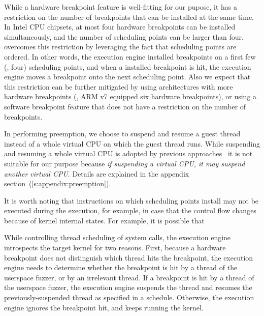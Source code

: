 %
While a hardware breakpoint feature is well-fitting for our pupose, it
has a restriction on the number of breakpoints that can be installed
at the same time.
%
In Intel CPU chipsets, at most four hardware breakpoints can be
installed simultaneously, and the number of scheduling points can be
larger than four.
%
\dr{} \sys overcomes this restriction by leveraging the fact that
scheduling points are ordered. In other words, the execution engine
installed breakpoints on a first few (\eg, four) scheduling points,
and when a installed breakpoint is hit, the execution engine moves a
breakpoint onto the next scheduling point.
%
Also we expect that this restriction can be further mitigated by using
architectures with more hardware breakpoints (\eg, ARM v7 equipped six
hardware breakpoints), or using a software breakpoint feature that
does not have a restriction on the number of breakpoints.



%
In performing preemption, we choose to suspend and resume a guest
thread instead of a whole virtual CPU on which the guest thread runs.
%
While suspending and resuming a whole virtual CPU is adopted by
previous approaches~\cite{ski, snowboard, razzer} it is not suitable
for our purpose because \textit{if suspending a virtual CPU, it may
  suspend another virtual CPU}. Details are explained in the appendix
section~(\autoref{s:appendix:preemption}).




%
It is worth noting that instructions on which scheduling points
install may not be executed during the execution, for example, in case
that the control flow changes because of kernel internal states.
%
For example, it is possible that

\dr{}




%
While controlling thread scheduling of system calls, the execution
engine introspects the target kernel for two reasons.
%
First, because a hardware breakpoint does not distinguish which thread
hits the breakpoint, the execution engine needs to determine whether
the breakpoint is hit by a thread of the userspace fuzzer, or by an
irrelevant thread.
%
If a breakpoint is hit by a thread of the userspace fuzzer, the
execution engine suspends the thread and resumes the
previously-suspended thread as specified in a schedule.
%
Otherwise, the execution engine ignores the breakpoint hit, and keeps
running the kernel.


